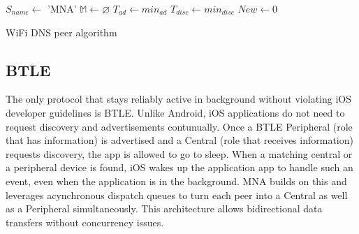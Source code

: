 \documentclass[conference]{IEEEtran}
\begin{document}
\begin{algorithm}[htb!]
\label{algo:dns}
\DontPrintSemicolon %
\SetAlgoLined
{}
 $S_{name} \gets$ \textsf{'MNA'}\;
 $\mathbb{M} \gets \varnothing$\;
 $T_{ad} \gets min_{ad}$\;
 $T_{disc} \gets min_{disc}$\;
 $New \gets 0$
 \caption{WiFi DNS peer algorithm}
\end{algorithm}
%
\subsection{BTLE}
\label{sec:btle}
%
The only protocol that stays reliably active in
background without violating iOS developer guidelines is BTLE. Unlike
Android, iOS applications do not need to request discovery and
advertisements contunually. Once a BTLE Peripheral (role that has
information) is advertised and a Central (role that receives
information) requests discovery, the app is allowed to go to
sleep. When a matching central or a peripheral device is found, iOS
wakes up the application app to handle such an event, even when the
application is in the background. MNA builds on this and leverages
acynchronous dispatch queues to turn each peer into a Central as well
as a Peripheral simultaneously. This architecture allows bidirectional
data transfers without concurrency issues.
\end{document}
